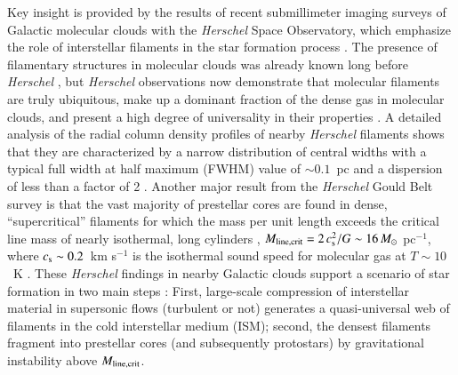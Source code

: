 \documentclass{aa}
\begin{document}
Key insight is provided by the results of recent submillimeter imaging surveys of Galactic molecular clouds with 
the {\it Herschel} Space Observatory, which emphasize 
the role of interstellar filaments in the star formation process \citep[e.g.][]{Andre10, Molinari10}. 
The presence of filamentary structures in molecular clouds was already known long before {\it Herschel} 
\citep[e.g.][]{SchneiderElmegreen79,Myers09}, but 
{\it Herschel} observations now demonstrate 
that molecular filaments are truly ubiquitous, 
make up a dominant fraction of the dense gas in molecular clouds,  
and present a high degree of universality in their properties 
\citep[e.g.][]{Arzoumanian11,Hill11,Schisano14,Konyves15}. 
A detailed analysis of the radial column density profiles 
of nearby {\it Herschel} filaments shows that they are characterized 
by a narrow distribution of central widths with a typical 
full width at half maximum (FWHM) value of $\sim 0.1$~pc and a dispersion of less than a factor of 2 \citep[][]{Arzoumanian11}. 
Another major result from the {\it Herschel} Gould Belt survey \citep[HGBS --][]{Andre10}  
is that the vast majority of prestellar cores 
are found in dense, ``supercritical''  filaments for which 
the mass per unit length exceeds the critical line mass of nearly isothermal, long cylinders  
\citep[e.g.][]{Inutsuka97}, $M_{\rm line, crit} = 2\, c_{\rm s}^2/G \sim 16\, M_\odot$ pc$^{-1}$,  
where $c_{\rm s} \sim 0.2$~km s$^{-1}$ is the isothermal sound speed for molecular gas at $T \sim 10$~K 
\citep[e.g.][]{Konyves15}. 
These {\it Herschel} findings in nearby Galactic clouds support a scenario of star formation 
in two main steps \citep[cf.][]{Andre14}: 
First, large-scale compression of interstellar material in supersonic 
flows (turbulent or not) generates a quasi-universal web of 
filaments  in the cold interstellar medium (ISM); 
second, the densest filaments fragment into 
prestellar cores (and subsequently protostars) by gravitational instability above $M_{\rm line, crit} $.
\end{document}
